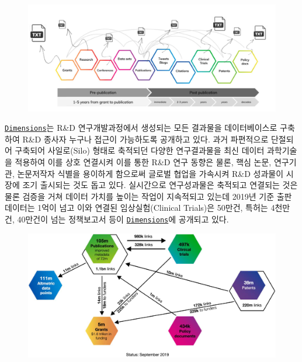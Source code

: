\documentclass[smallextended]{svjour3}       %
\begin{document}
\begin{figure}

{\centering \includegraphics[width=1\linewidth]{fig/rnd-lifecycle-text} 

}

\end{figure}

\href{https://www.dimensions.ai/}{\texttt{Dimensions}}는 R\&D
연구개발과정에서 생성되는 모든 결과물을 데이터베이스로 구축하여 R\&D
종사자 누구나 접근이 가능하도록 공개하고 있다. 과거 파편적으로 단절되어
구축되어 사일로(Silo) 형태로 축적되던 다양한 연구결과물을 최신 데이터
과학기술을 적용하여 이를 상호 연결시켜 이를 통한 R\&D 연구 동향은 물론,
핵심 논문, 연구기관, 논문저작자 식별을 용이하게 함으로써 글로벌 협업을
가속시켜 R\&D 성과물이 시장에 조기 출시되는 것도 돕고 있다. 실시간으로
연구성과물은 축적되고 연결되는 것은 물론 검증을 거쳐 데이터 가치를
높이는 작업이 지속적되고 있는데 2019년 기준 출판 데이터는 1억이 넘고
이와 연결된 임상실험(Clinical Trials)은 50만건, 특허는 4천만건, 40만건이
넘는 정책보고서 등이
\href{https://www.dimensions.ai/}{\texttt{Dimensions}}에 공개되고 있다.

\begin{figure}

{\centering \includegraphics[width=1\linewidth]{fig/rnd-dimensions-ai} 

}

\end{figure}
\end{document}
